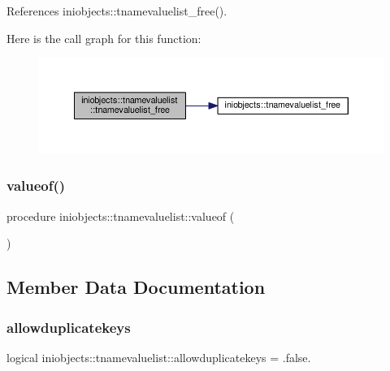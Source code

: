 References iniobjects\+::tnamevaluelist\+\_\+free().

Here is the call graph for this function\+:
\nopagebreak
\begin{figure}[H]
\begin{center}
\leavevmode
\includegraphics[width=350pt]{structiniobjects_1_1tnamevaluelist_a7e700d2d9876e90a8ec4e31895d92bcd_cgraph}
\end{center}
\end{figure}
\mbox{\label{structiniobjects_1_1tnamevaluelist_a47c542c4cd1f604b0e065ace2db14b1d}} 
\subsubsection{\texorpdfstring{valueof()}{valueof()}}
{\footnotesize\ttfamily procedure iniobjects\+::tnamevaluelist\+::valueof (\begin{DoxyParamCaption}{ }\end{DoxyParamCaption})\hspace{0.3cm}{\ttfamily [private]}}



\subsection{Member Data Documentation}
\mbox{\label{structiniobjects_1_1tnamevaluelist_a7d6a2f0bdf3ee393f5cb41e12c37e298}} 
\subsubsection{\texorpdfstring{allowduplicatekeys}{allowduplicatekeys}}
{\footnotesize\ttfamily logical iniobjects\+::tnamevaluelist\+::allowduplicatekeys = .false.\hspace{0.3cm}{\ttfamily [private]}}

